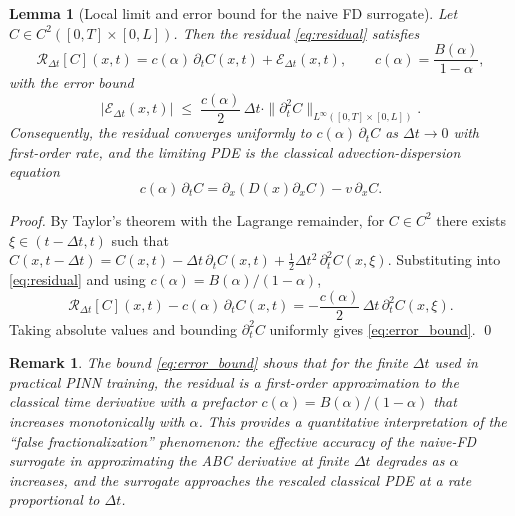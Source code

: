 \documentclass[11pt]{article}
\newtheorem{lemma}{Lemma}
\newtheorem{remark}{Remark}
\begin{document}
\begin{lemma}[Local limit and error bound for the naive FD surrogate]
\label{prop:local_limit}
Let \(C \in C^2([0,T]\times[0,L])\). Then the residual \eqref{eq:residual} satisfies
\begin{equation}
\mathcal{R}_{\Delta t}[C](x,t) = c(\alpha)\,\partial_t C(x,t) + \mathcal{E}_{\Delta t}(x,t),
\qquad c(\alpha) = \frac{B(\alpha)}{1-\alpha},
\end{equation}
with the error bound
\begin{equation}
|\mathcal{E}_{\Delta t}(x,t)| \;\leq\; \frac{c(\alpha)}{2}\,\Delta t \cdot \|\partial_t^2 C\|_{L^\infty([0,T]\times[0,L])}.
\label{eq:error_bound}
\end{equation}
Consequently, the residual converges uniformly to \(c(\alpha)\,\partial_t C\) as \(\Delta t \to 0\) with first-order rate, and the limiting PDE is the classical advection-dispersion equation
\begin{equation}
c(\alpha)\,\partial_t C = \partial_x\!\left(D(x)\partial_x C\right) - v\,\partial_x C.
\label{eq:classical_rescaled}
\end{equation}
\end{lemma}

\begin{proof}
By Taylor's theorem with the Lagrange remainder, for \(C \in C^2\) there exists \(\xi \in (t-\Delta t, t)\) such that
\(C(x,t-\Delta t) = C(x,t) - \Delta t\,\partial_t C(x,t) + \tfrac{1}{2}\Delta t^2\,\partial_t^2 C(x,\xi)\).
Substituting into \eqref{eq:residual} and using \(c(\alpha) = B(\alpha)/(1-\alpha)\),
\begin{equation}
\mathcal{R}_{\Delta t}[C](x,t) - c(\alpha)\,\partial_t C(x,t) = -\frac{c(\alpha)}{2}\,\Delta t\,\partial_t^2 C(x,\xi).
\end{equation}
Taking absolute values and bounding \(\partial_t^2 C\) uniformly gives \eqref{eq:error_bound}. \qed
\end{proof}

\begin{remark}
The bound \eqref{eq:error_bound} shows that for the finite \(\Delta t\) used in practical PINN training, the residual is a first-order approximation to the classical time derivative with a prefactor \(c(\alpha) = B(\alpha)/(1-\alpha)\) that increases monotonically with \(\alpha\). This provides a quantitative interpretation of the ``false fractionalization'' phenomenon: the effective accuracy of the naive-FD surrogate in approximating the ABC derivative at finite \(\Delta t\) degrades as \(\alpha\) increases, and the surrogate approaches the rescaled classical PDE at a rate proportional to \(\Delta t\).
\end{remark}
\end{document}
